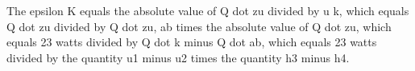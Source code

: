 The epsilon K equals the absolute value of Q dot zu divided by u k, which equals Q dot zu divided by Q dot zu, ab times the absolute value of Q dot zu, which equals 23 watts divided by Q dot k minus Q dot ab, which equals 23 watts divided by the quantity u1 minus u2 times the quantity h3 minus h4.